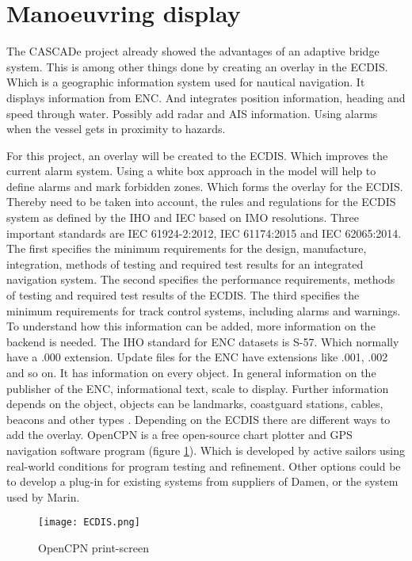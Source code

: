 \section{Manoeuvring display}
The CASCADe project already showed the advantages of an adaptive bridge system. This is among other things done by creating an overlay in the \ac{ECDIS}. Which is a geographic information system used for nautical navigation. It displays information from \ac{ENC}. And integrates position information, heading and speed through water. Possibly add radar and \ac{AIS} information. Using alarms when the vessel gets in proximity to hazards. 

For this project, an overlay will be created to the \ac{ECDIS}. Which improves the current alarm system. Using a white box approach in the model will help to define alarms and mark forbidden zones. Which forms the overlay for the \ac{ECDIS}.
Thereby need to be taken into account, the rules and regulations for the \ac{ECDIS} system as defined by the \ac{IHO} and \ac{IEC} based on \ac{IMO} resolutions. Three important standards are IEC 61924-2:2012, IEC 61174:2015 and IEC 62065:2014.
The first specifies the minimum requirements for the design, manufacture, integration, methods of testing and required test results for an integrated navigation system.
The second specifies the performance requirements, methods of testing and required test results of the \ac{ECDIS}.
The third specifies the minimum requirements for track control systems, including alarms and warnings.
To understand how this information can be added, more information on the backend is needed. The \ac{IHO} standard for \ac{ENC} datasets is S-57. Which normally have a .000 extension. Update files for the \ac{ENC} have extensions like .001, .002 and so on. It has information on every object. In general information on the publisher of the \ac{ENC}, informational text, scale to display. Further information depends on the object, objects can be landmarks, coastguard stations, cables, beacons and other types \cite{IHO2017}. 
Depending on the \ac{ECDIS} there are different ways to add the overlay. OpenCPN is a free open-source chart plotter and GPS navigation software program (figure \ref{fig:ECDIS}). Which is developed by active sailors using real-world conditions for program testing and refinement.
Other options could be to develop a plug-in for existing systems from suppliers of Damen, or the system used by Marin.

\begin{figure}[H]
	\centering
	\texttt{[image: ECDIS.png]}
	\caption{OpenCPN print-screen}
	\label{fig:ECDIS}
\end{figure}



